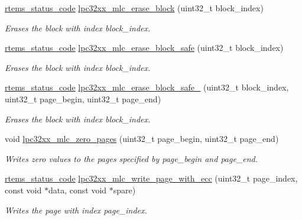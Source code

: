 \begin{DoxyCompactItemize}
\mbox{\hyperlink{group__ClassicStatus_ga545d41846817eaba6143d52ee4d9e9fe}{rtems\+\_\+status\+\_\+code}} \mbox{\hyperlink{group__lpc32xx__nand__mlc_ga602a6e700d0e763ba5ca98874b92f926}{lpc32xx\+\_\+mlc\+\_\+erase\+\_\+block}} (uint32\+\_\+t block\+\_\+index)
\begin{DoxyCompactList}\small\item\em Erases the block with index {\itshape block\+\_\+index}. \end{DoxyCompactList}\item 
\mbox{\hyperlink{group__ClassicStatus_ga545d41846817eaba6143d52ee4d9e9fe}{rtems\+\_\+status\+\_\+code}} \mbox{\hyperlink{group__lpc32xx__nand__mlc_gab3b2378535527c368dd10f78a4eca68c}{lpc32xx\+\_\+mlc\+\_\+erase\+\_\+block\+\_\+safe}} (uint32\+\_\+t block\+\_\+index)
\begin{DoxyCompactList}\small\item\em Erases the block with index {\itshape block\+\_\+index}. \end{DoxyCompactList}\item 
\mbox{\hyperlink{group__ClassicStatus_ga545d41846817eaba6143d52ee4d9e9fe}{rtems\+\_\+status\+\_\+code}} \mbox{\hyperlink{group__lpc32xx__nand__mlc_gab7abd0702699aa8db9c2acb4eb55258c}{lpc32xx\+\_\+mlc\+\_\+erase\+\_\+block\+\_\+safe\+\_}} (uint32\+\_\+t block\+\_\+index, uint32\+\_\+t page\+\_\+begin, uint32\+\_\+t page\+\_\+end)
\begin{DoxyCompactList}\small\item\em Erases the block with index {\itshape block\+\_\+index}. \end{DoxyCompactList}\item 
void \mbox{\hyperlink{group__lpc32xx__nand__mlc_gae790b87623d06d4795abd696698e9344}{lpc32xx\+\_\+mlc\+\_\+zero\+\_\+pages}} (uint32\+\_\+t page\+\_\+begin, uint32\+\_\+t page\+\_\+end)
\begin{DoxyCompactList}\small\item\em Writes zero values to the pages specified by {\itshape page\+\_\+begin} and {\itshape page\+\_\+end}. \end{DoxyCompactList}\item 
\mbox{\hyperlink{group__ClassicStatus_ga545d41846817eaba6143d52ee4d9e9fe}{rtems\+\_\+status\+\_\+code}} \mbox{\hyperlink{group__lpc32xx__nand__mlc_ga3e7231705d7d840e2e71fbb64534b2f0}{lpc32xx\+\_\+mlc\+\_\+write\+\_\+page\+\_\+with\+\_\+ecc}} (uint32\+\_\+t page\+\_\+index, const void $\ast$data, const void $\ast$spare)
\begin{DoxyCompactList}\small\item\em Writes the page with index {\itshape page\+\_\+index}. \end{DoxyCompactList}\item 

\end{DoxyCompactItemize}
